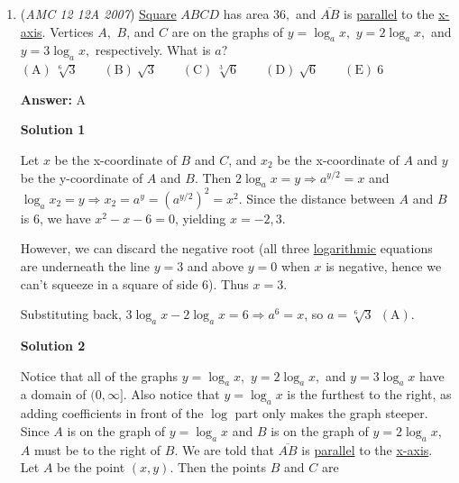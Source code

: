 \begin{enumerate}
 Note: Although this solution takes a while to read (as well as to write) the actual time it takes to think through the process above is very short in comparison to the solution length.

 


	\item (\textit{AMC 12 12A 2007}) \href{https://artofproblemsolving.com/wiki/index.php?title=Square}{Square} $ABCD$ has area $36,$ and $\overline{AB}$ is \href{https://artofproblemsolving.com/wiki/index.php?title=Parallel}{parallel} to the \href{https://artofproblemsolving.com/wiki/index.php?title=X-axis}{x-axis}. Vertices $A,$ $B$, and $C$ are on the graphs of $y = \log_{a}x,$ $y = 2\log_{a}x,$ and $y = 3\log_{a}x,$ respectively. What is $a?$
$\mathrm{(A)}\ \sqrt [6]{3}\qquad \mathrm{(B)}\ \sqrt {3}\qquad \mathrm{(C)}\ \sqrt [3]{6}\qquad \mathrm{(D)}\ \sqrt {6}\qquad \mathrm{(E)}\ 6$

 \textbf{Answer: }A



\textbf{Solution 1}

Let $x$ be the x-coordinate of $B$ and $C$, and $x_2$ be the x-coordinate of $A$ and $y$ be the y-coordinate of $A$ and $B$. Then $2\log_ax= y \Longrightarrow a^{y/2} = x$ and $\log_ax_2 = y \Longrightarrow x_2 = a^y = \left(a^{y/2}\right)^2 = x^2$. Since the distance between $A$ and $B$ is $6$, we have $x^2 - x - 6 = 0$, yielding $x = -2, 3$.

 However, we can discard the negative root (all three \href{https://artofproblemsolving.com/wiki/index.php?title=Logarithm}{logarithmic} equations are underneath the line $y = 3$ and above $y = 0$ when $x$ is negative, hence we can't squeeze in a square of side 6). Thus $x = 3$.

 Substituting back, $3\log_{a}x - 2\log_{a}x = 6 \Longrightarrow a^6 = x$, so $a = \sqrt[6]{3}\ \ \mathrm{(A)}$.

 



\textbf{Solution 2}

Notice that all of the graphs $y = \log_{a}x,$ $y = 2\log_{a}x,$ and $y = 3\log_{a}x$ have a domain of $(0, \infty]$. Also notice that $y = \log_{a}x$ is the furthest to the right, as adding coefficients in front of the $\log$ part only makes the graph steeper. Since $A$ is on the graph of $y = \log_{a}x$ and $B$ is on the graph of $y = 2\log_{a}x$, $\,$ $A$ must be to the right of $B$. We are told that $\overline{AB}$ is \href{https://artofproblemsolving.com/wiki/index.php?title=Parallel}{parallel} to the \href{https://artofproblemsolving.com/wiki/index.php?title=X-axis}{x-axis}. Let $A$ be the point $(x, y)$. Then the points $B$ and $C$ are


\end{enumerate}
